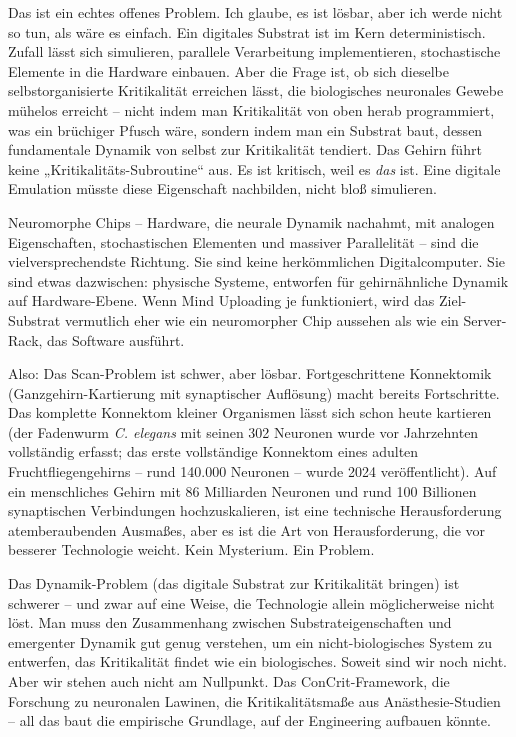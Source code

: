 \documentclass[11pt, twoside, openright]{book}
\begin{document}
Das ist ein echtes offenes Problem. Ich glaube, es ist lösbar, aber ich werde nicht so tun, als wäre es einfach. Ein digitales Substrat ist im Kern deterministisch. Zufall lässt sich simulieren, parallele Verarbeitung implementieren, stochastische Elemente in die Hardware einbauen. Aber die Frage ist, ob sich dieselbe selbstorganisierte Kritikalität erreichen lässt, die biologisches neuronales Gewebe mühelos erreicht -- nicht indem man Kritikalität von oben herab programmiert, was ein brüchiger Pfusch wäre, sondern indem man ein Substrat baut, dessen fundamentale Dynamik von selbst zur Kritikalität tendiert. Das Gehirn führt keine „Kritikalitäts-Subroutine“ aus. Es ist kritisch, weil es \textit{das} ist. Eine digitale Emulation müsste diese Eigenschaft nachbilden, nicht bloß simulieren.

Neuromorphe Chips -- Hardware, die neurale Dynamik nachahmt, mit analogen Eigenschaften, stochastischen Elementen und massiver Parallelität -- sind die vielversprechendste Richtung. Sie sind keine herkömmlichen Digitalcomputer. Sie sind etwas dazwischen: physische Systeme, entworfen für gehirnähnliche Dynamik auf Hardware-Ebene. Wenn Mind Uploading je funktioniert, wird das Ziel-Substrat vermutlich eher wie ein neuromorpher Chip aussehen als wie ein Server-Rack, das Software ausführt.

Also: Das Scan-Problem ist schwer, aber lösbar. Fortgeschrittene Konnektomik (Ganzgehirn-Kartierung mit synaptischer Auflösung) macht bereits Fortschritte. Das komplette Konnektom kleiner Organismen lässt sich schon heute kartieren (der Fadenwurm \textit{C. elegans} mit seinen 302 Neuronen wurde vor Jahrzehnten vollständig erfasst; das erste vollständige Konnektom eines adulten Fruchtfliegengehirns -- rund 140.000 Neuronen -- wurde 2024 veröffentlicht). Auf ein menschliches Gehirn mit 86 Milliarden Neuronen und rund 100 Billionen synaptischen Verbindungen hochzuskalieren, ist eine technische Herausforderung atemberaubenden Ausmaßes, aber es ist die Art von Herausforderung, die vor besserer Technologie weicht. Kein Mysterium. Ein Problem.

Das Dynamik-Problem (das digitale Substrat zur Kritikalität bringen) ist schwerer -- und zwar auf eine Weise, die Technologie allein möglicherweise nicht löst. Man muss den Zusammenhang zwischen Substrateigenschaften und emergenter Dynamik gut genug verstehen, um ein nicht-biologisches System zu entwerfen, das Kritikalität findet wie ein biologisches. Soweit sind wir noch nicht. Aber wir stehen auch nicht am Nullpunkt. Das ConCrit-Framework, die Forschung zu neuronalen Lawinen, die Kritikalitätsmaße aus Anästhesie-Studien -- all das baut die empirische Grundlage, auf der Engineering aufbauen könnte.
\end{document}
